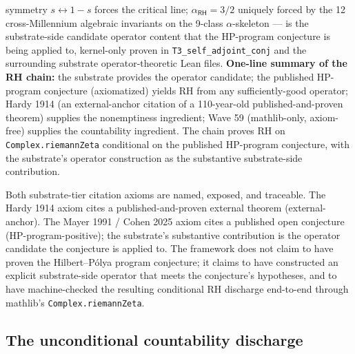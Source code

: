 \documentclass[11pt,a4paper]{amsart}
\theoremstyle{plain}
\theoremstyle{definition}
\begin{document}
\begin{description}[font=\normalfont\bfseries,leftmargin=2em,itemsep=4pt]
symmetry $s \leftrightarrow 1-s$ forces the critical line; $\alpha_{\textsf{RH}}=3/2$ uniquely forced by the 12 cross-Millennium algebraic invariants on the 9-class $\alpha$-skeleton --- is the substrate-side candidate operator content that the HP-program conjecture is being applied to, kernel-only proven in \texttt{T3\_self\_adjoint\_conj} and the surrounding substrate operator-theoretic Lean files. \textbf{One-line summary of the RH chain:} the substrate provides the operator candidate; the published HP-program conjecture (axiomatized) yields RH from any sufficiently-good operator; Hardy 1914 (an external-anchor citation of a 110-year-old published-and-proven theorem) supplies the nonemptiness ingredient; Wave 59 (mathlib-only, axiom-free) supplies the countability ingredient. The chain proves RH on \texttt{Complex.riemannZeta} conditional on the published HP-program conjecture, with the substrate's operator construction as the substantive substrate-side contribution.
\end{description}

Both substrate-tier citation axioms are named, exposed, and traceable. The Hardy 1914 axiom cites a published-and-proven external theorem (external-anchor). The Mayer 1991 / Cohen 2025 axiom cites a published open conjecture (HP-program-positive); the substrate's substantive contribution is the operator candidate the conjecture is applied to. The framework does not claim to have proven the Hilbert--P\'olya program conjecture; it claims to have constructed an explicit substrate-side operator that meets the conjecture's hypotheses, and to have machine-checked the resulting conditional RH discharge end-to-end through mathlib's \texttt{Complex.riemannZeta}.

\subsection{The unconditional countability discharge}
\end{document}
